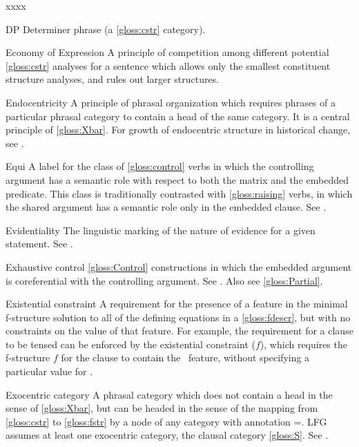 \documentclass[output=paper,colorlinks,citecolor=brown]{langscibook}
\begin{document}
\begin{labeling}{xxxx}
\item[DP\namedlabel{gloss:DP}{DP}] Determiner phrase (a \ref{gloss:cstr} category).

\item[Economy of Expression] A principle of competition among different potential \ref{gloss:cstr} analyses for a sentence which allows only the smallest constituent structure analyses, and rules out larger structures.

\item[Endocentricity] A principle of phrasal organization which requires phrases of a particular phrasal category to contain a head of the same category. It is a central principle of \ref{gloss:Xbar}.  For growth of endocentric structure in historical change, see \citetv[\ref{subsect:growth}]{chapters/Historical}.

\item[Equi] A label for the class of \ref{gloss:control} verbs in which the controlling argument has a semantic role with respect to both the matrix and the embedded predicate. This class is traditionally contrasted with \ref{gloss:raising} verbs, in which the shared argument has a semantic role only in the embedded clause. See .
  
\item[Evidentiality] The linguistic marking of the nature of evidence for a given statement. See \citet{chapters/FinnoUgric}.

\item[Exhaustive control\namedlabel{gloss:exhaustive}{exhaustive}\namedlabel{gloss:Exhaustive}{Exhaustive control}] \ref{gloss:Control} constructions in which the embedded argument is coreferential with the controlling argument. See .  Also see \ref{gloss:Partial}.

\item[Existential constraint] A requirement for the presence of a feature in the minimal f-structure solution to all of the defining equations in a \ref{gloss:fdescr}, but with no constraints on the value of that feature.  For example, the requirement for a clause to be tensed can be enforced by the existential constraint ($f$\;\TENSE), which requires the f-structure $f$ for the clause to contain the \TENSE\ feature, without specifying a particular value for \TENSE.

\item[Exocentric category\namedlabel{gloss:exocentric}{exocentric}] A phrasal category which does not contain a head in the sense of \ref{gloss:Xbar}, but can be headed in the sense of the mapping from \ref{gloss:cstr} to \ref{gloss:fstr} by a node of any category with annotation \UP=\DOWN. LFG assumes at least one exocentric category, the clausal category \ref{gloss:S}.  See \citetv[\ref{sect:xbar}]{chapters/CoreConcepts}.


\end{labeling}
\end{document}
